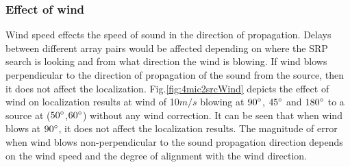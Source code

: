 \subsubsection{Effect of wind}
Wind speed effects the speed of sound in the direction of propagation. Delays between different array pairs would be affected depending on where the SRP search is looking and from what direction the wind is blowing. If wind blows perpendicular to the direction of propagation of the sound from the source, then it does not affect the localization. Fig.\ref{fig:4mic2srcWind} depicts the effect of wind on localization results at wind of 10$m/s$ blowing at $90\degree$, $45\degree$ and $180\degree$ to a source at ($50\degree$,$60\degree$) without any wind correction. It can be seen that when wind blows at $90\degree$, it does not affect the localization results. The magnitude of error when wind blows non-perpendicular to the sound propagation direction depends on the wind speed and the degree of alignment with the wind direction.
